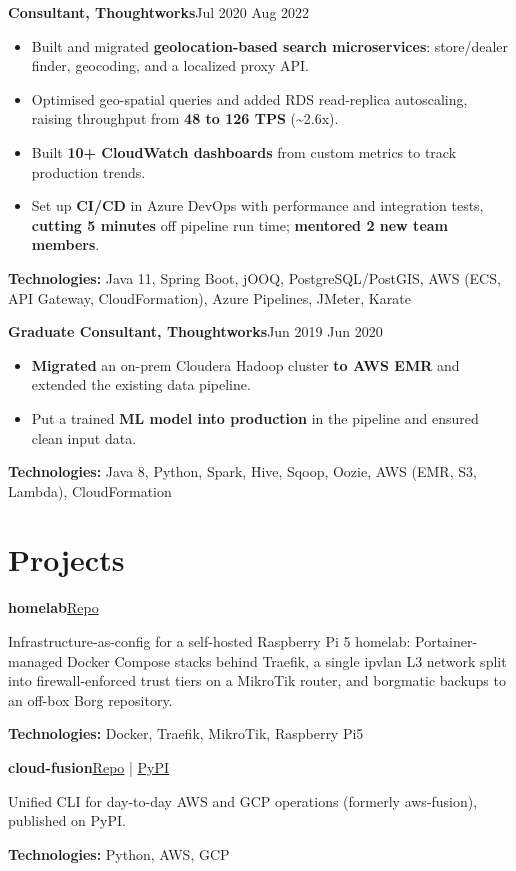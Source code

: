 \documentclass[10pt,a4paper]{article}
\newcommand{\entry}[2]{\textbf{#1}\hfill{\small\color{dim}#2}\par\vspace{1pt}}
\newcommand{\tech}[1]{{\small\color{dim}\textbf{Technologies:} #1}\par}
\begin{document}
\newpage
\entry{Consultant, Thoughtworks}{Jul 2020 \textendash{} Aug 2022}
\begin{itemize}
  \item Built and migrated \textbf{geolocation-based search microservices}: store/dealer finder, geocoding, and a localized proxy API\@.
  \item Optimised geo-spatial queries and added RDS read-replica autoscaling, raising throughput from \textbf{48 to 126 TPS} (\textasciitilde{}2.6x).
  \item Built \textbf{10+ CloudWatch dashboards} from custom metrics to track production trends.
  \item Set up \textbf{CI/CD} in Azure DevOps with performance and integration tests, \textbf{cutting 5 minutes} off pipeline run time; \textbf{mentored 2 new team members}.
\end{itemize}
\tech{Java 11, Spring Boot, jOOQ, PostgreSQL/PostGIS, AWS (ECS, API Gateway, CloudFormation), Azure Pipelines, JMeter, Karate}

\vspace{6pt}
\entry{Graduate Consultant, Thoughtworks}{Jun 2019 \textendash{} Jun 2020}
\begin{itemize}
  \item \textbf{Migrated} an on-prem Cloudera Hadoop cluster \textbf{to AWS EMR} and extended the existing data pipeline.
  \item Put a trained \textbf{ML model into production} in the pipeline and ensured clean input data.
\end{itemize}
\tech{Java 8, Python, Spark, Hive, Sqoop, Oozie, AWS (EMR, S3, Lambda), CloudFormation}

\section*{Projects}

\entry{homelab}{\href{https://github.com/snigdhasjg/homelab}{Repo}}
Infrastructure-as-config for a self-hosted Raspberry Pi 5 homelab: Portainer-managed Docker Compose stacks behind Traefik, a single ipvlan L3 network split into firewall-enforced trust tiers on a MikroTik router, and borgmatic backups to an off-box Borg repository.\par
\tech{Docker, Traefik, MikroTik, Raspberry Pi5}

\vspace{4pt}
\entry{cloud-fusion}{\href{https://github.com/snigdhasjg/cloud-fusion}{Repo} | \href{https://pypi.org/project/cloud-fusion}{PyPI}}
Unified CLI for day-to-day AWS and GCP operations (formerly aws-fusion), published on PyPI.\par
\tech{Python, AWS, GCP}
\end{document}
